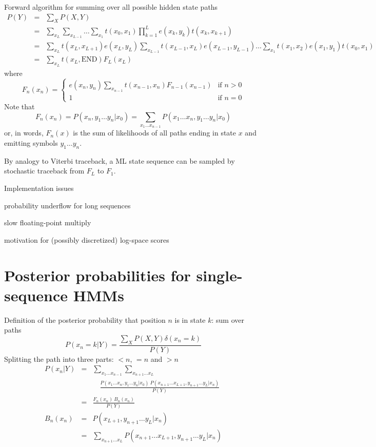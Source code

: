 \documentclass{beamer}
\begin{document}
\begin{frame}{}
\tiny
Forward algorithm for summing over all possible hidden state paths
\begin{eqnarray*}
P(Y) & = & \sum_X P(X,Y) \\
& = & \sum_{x_L} \sum_{x_{L-1}} \ldots \sum_{x_1} t(x_0,x_1) \prod_{k=1}^L e(x_k,y_k) t(x_k,x_{k+1}) \\
& = & \sum_{x_L} t(x_L,x_{L+1}) e(x_L,y_L) \sum_{x_{L-1}} t(x_{L-1},x_L) e(x_{L-1},y_{L-1}) \ldots \sum_{x_1} t(x_1,x_2) e(x_1,y_1) t(x_0,x_1) \\
& = & \sum_{x_L} t(x_L,\mbox{END}) F_L(x_L)
\end{eqnarray*}
where
\[
F_n(x_n) = \left\{ \begin{array}{ll} \displaystyle
e(x_n,y_n) \sum_{x_{n-1}} t(x_{n-1},x_n) F_{n-1}(x_{n-1}) & \mbox{if $n > 0$} \\
1 & \mbox{if $n=0$}
\end{array} \right.
\]
Note that
\[
F_n(x_n) = P(x_n, y_1 \ldots y_n | x_0) = \sum_{x_1 \ldots x_{n-1}} P(x_1 \ldots x_n, y_1 \ldots y_n | x_0)
\]
or, in words, $F_n(x)$ is the sum of likelihoods of all paths ending in state $x$ and emitting symbols $y_1 \ldots y_n$.

By analogy to Viterbi traceback, a ML state sequence can be sampled by
stochastic traceback from $F_L$ to $F_1$.
\end{frame}

\begin{frame}{}
Implementation issues
 \itemb
 \item probability underflow for long sequences
 \item slow floating-point multiply
 \item motivation for (possibly discretized) log-space scores
 \iteme
\end{frame}

\section{Posterior probabilities for single-sequence HMMs}

\begin{frame}{}

\small

Definition of the posterior probability that position $n$ is in state $k$: sum over paths
\[
P(x_n=k|Y) = \frac{\sum_X P(X,Y) \delta(x_n=k)}{P(Y)}
\]
Splitting the path into three parts: $<n$, $=n$ and $>n$
\begin{eqnarray*}
P(x_n|Y)
& = & \sum_{x_1 \ldots x_{n-1}} \sum_{x_{n+1} \ldots x_L} \\
& & \quad \frac{P(x_1 \ldots x_n,y_1 \ldots y_n|x_0)\ P(x_{n+1} \ldots x_{L+1},y_{n+1} \ldots y_L|x_n)}{P(Y)} \\
& = & \frac{F_n(x_n)\ B_n(x_n)}{P(Y)} \\
B_n(x_n) & = & P(x_{L+1},y_{n+1} \ldots y_L|x_n) \\
& = & \sum_{x_{n+1} \ldots x_L} P(x_{n+1} \ldots x_{L+1}, y_{n+1} \ldots y_L|x_n)
\end{eqnarray*}
\end{frame}
\end{document}
